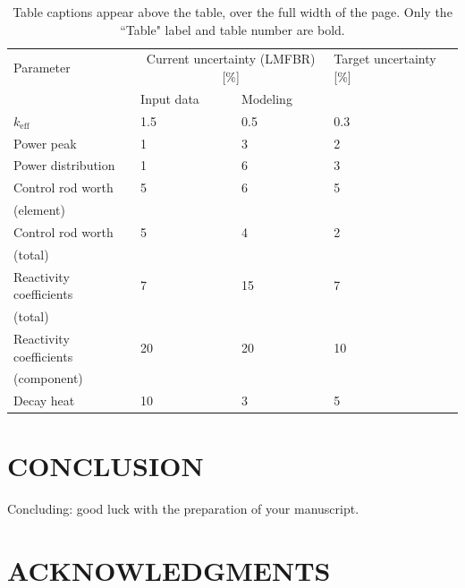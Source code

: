 \documentclass[12pt]{article}
\begin{document}
\begin{table}[ht]
  \begin{center}
    \caption{\label{tab::unc}Table captions appear above the table, over the full width of the page. Only the ``Table" label and table number are bold.}
    \begin{tabular}{llll}
    \toprule
    Parameter & \multicolumn{2}{c}{Current uncertainty (LMFBR) [\%]} & Target uncertainty [\%]\\
              & Input data                & Modeling &                    \\
    \midrule
    $k_\text{eff}$          & 1.5 & 0.5 & 0.3 \\
    Power peak              & 1   & 3   & 2   \\
    Power distribution      & 1   & 6   & 3   \\
    Control rod worth       & 5   & 6   & 5   \\
    (element)               &     &     &     \\
    Control rod worth       & 5   & 4   & 2   \\
    (total)                 &     &     &     \\
    Reactivity coefficients & 7   & 15  & 7   \\
    (total)                 &     &     &     \\
    Reactivity coefficients & 20  & 20  & 10  \\
    (component)             &     &     &     \\
    Decay heat              & 10  & 3   & 5   \\
    \bottomrule
    \end{tabular}
  \end{center}
\end{table}

%
\section{CONCLUSION} 
\label{sect::conclusion}

Concluding: good luck with the preparation of your manuscript.

%
\section*{ACKNOWLEDGMENTS}
\end{document}
